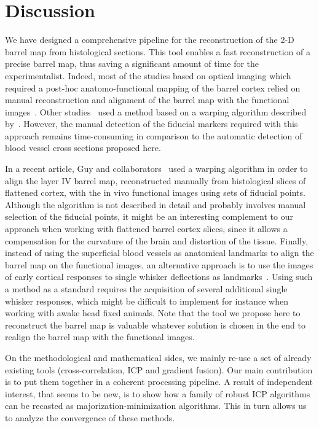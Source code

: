 
\section*{Discussion}

We have designed a comprehensive pipeline for the reconstruction of the 2-D barrel map from histological sections. This tool enables a fast reconstruction of a precise barrel map, thus saving a significant amount of time for the experimentalist. 
%
Indeed, most of the studies based on optical imaging which required a post-hoc anatomo-functional mapping of the barrel cortex relied on manual reconstruction and alignment of the barrel map with the functional images~\cite{Kleinfeld1996,Takashima2001,ferezou_2006,Kerr2007,Tsytsarev2010,Lustig2013,Harris2013}. 
Other studies~\cite{Berwick2004,Berwick2008,Devonshire2010} used a method based on a warping algorithm described by~\cite{Zheng2010}. However, the manual detection of the fiducial markers required with this approach remains time-consuming in comparison to the automatic detection of blood vessel cross sections proposed here.

In a recent article, Guy and collaborators~\cite{Guy2014} used a warping algorithm in order to align the layer IV barrel map, reconstructed manually from histological slices of flattened cortex, with the in vivo functional images using sets of fiducial points. Although the algorithm is not described in detail and probably involves manual selection of the fiducial points, it might be an interesting complement to our approach when working with flattened barrel cortex slices, since it allows a compensation for the curvature of the brain and distortion of the tissue.
%
Finally, instead of using the superficial blood vessels as anatomical landmarks to align the barrel map on the functional images, an alternative approach is to use the images of early cortical responses to single whisker deflections as landmarks~\cite{Wallace2008,Wang2012,Yang2013}.
%
Using such a method as a standard requires the acquisition of several additional single whisker responses, which might be difficult to implement for instance when working with awake head fixed animals.
Note that the tool we propose here to reconstruct the barrel map is valuable whatever solution is chosen in the end to realign the barrel map with the functional images.


On the methodological and mathematical sides, we mainly re-use a set of already existing tools (cross-correlation, ICP and gradient fusion). Our main contribution is to put them together in a coherent processing pipeline. A result of independent interest, that seems to be new, is to show how a family of robust ICP algorithms can be recasted as majorization-minimization algorithms. This in turn allows us to analyze the convergence of these methods.

